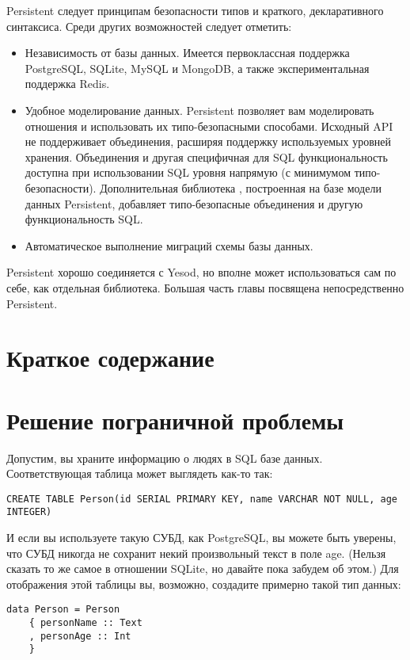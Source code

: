 Persistent следует принципам безопасности типов и краткого, декларативного
синтаксиса. Среди других возможностей следует отметить:
\begin{itemize}
  \item Независимость от базы данных. Имеется первоклассная поддержка
      PostgreSQL, SQLite, MySQL и MongoDB, а также экспериментальная поддержка
      Redis.

  \item Удобное моделирование данных. Persistent позволяет вам моделировать
      отношения и использовать их типо-безопасными способами. Исходный API не
      поддерживает объединения, расширяя поддержку используемых уровней
      хранения. Объединения и другая специфичная для SQL функциональность
      доступна при использовании SQL уровня напрямую (с минимумом
      типо-безопасности). Дополнительная библиотека
      ,
      построенная на базе модели данных Persistent, добавляет типо-безопасные
      объединения и другую функциональность SQL.

  \item Автоматическое выполнение миграций схемы базы данных.
\end{itemize}

Persistent хорошо соединяется с Yesod, но вполне может использоваться сам по
себе, как отдельная библиотека. Большая часть главы посвящена непосредственно
Persistent.

\section{Краткое содержание}


\section{Решение пограничной проблемы}

Допустим, вы храните информацию о людях в SQL базе данных. Соответствующая
таблица может выглядеть как-то так:
\begin{lstlisting}
CREATE TABLE Person(id SERIAL PRIMARY KEY, name VARCHAR NOT NULL, age INTEGER)
\end{lstlisting}

И если вы используете такую СУБД, как PostgreSQL, вы можете быть уверены, что
СУБД никогда не сохранит некий произвольный текст в поле age. (Нельзя сказать
то же самое в отношении SQLite, но давайте пока забудем об этом.) Для
отображения этой таблицы вы, возможно, создадите примерно такой тип данных:
\begin{lstlisting}
data Person = Person
    { personName :: Text
    , personAge :: Int
    }
\end{lstlisting}

